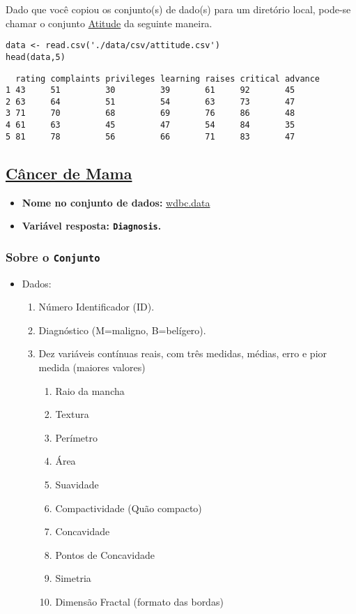 \documentclass[12pt]{article}
\begin{document}
Dado que você copiou os conjunto(s) de dado(s) para um diretório
local, pode-se chamar o conjunto \href{https://drive.google.com/file/d/1rKj4NPD61bWKD6HBC4fux2Eit6CNEKwr/view?usp=sharing}{Atitude} da seguinte maneira.

\begin{verbatim}
data <- read.csv('./data/csv/attitude.csv')
head(data,5)
\end{verbatim}

\begin{verbatim}
  rating complaints privileges learning raises critical advance
1 43     51         30         39       61     92       45     
2 63     64         51         54       63     73       47     
3 71     70         68         69       76     86       48     
4 61     63         45         47       54     84       35     
5 81     78         56         66       71     83       47     
\end{verbatim}
\clearpage

\subsection{\href{https://archive.ics.uci.edu/ml/datasets/Breast+Cancer+Wisconsin+\%28Diagnostic\%29}{Câncer de Mama}}
\label{sec:org92d804a}
\begin{itemize}
\item \textbf{Nome no conjunto de dados:} \href{https://drive.google.com/file/d/14WFx8oXCYst\_QPySIfuii660A93xg4pg/view?usp=sharing}{wdbc.data}
\item \textbf{Variável resposta:  \texttt{Diagnosis}.}
\end{itemize}
\subsubsection{Sobre o \texttt{Conjunto}}
\label{sec:org06eb3b0}
\begin{itemize}
\item Dados:
\begin{enumerate}
\item Número Identificador (ID).
\item Diagnóstico (M=maligno, B=belígero).
\item Dez variáveis contínuas reais, com três medidas, médias, erro e pior medida (maiores valores)
\begin{enumerate}
\item Raio da mancha
\item Textura
\item Perímetro
\item Área
\item Suavidade
\item Compactividade (Quão compacto)
\item Concavidade
\item Pontos de Concavidade
\item Simetria
\item Dimensão Fractal (formato das bordas)
\end{enumerate}
\end{enumerate}
\end{itemize}
\end{document}
